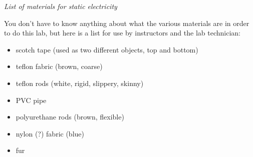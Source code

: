 \emph{List of materials for static electricity}

You don't have to know anything about what the various
materials are in order to do this lab, but here is a list for use
by instructors and the lab technician:

\begin{itemize}
\item scotch tape (used as two different objects, top and bottom)
\item teflon fabric (brown, coarse)
\item teflon rods (white, rigid, slippery, skinny)
\item PVC pipe
\item polyurethane rods (brown, flexible)
\item nylon (?) fabric (blue)
\item fur
\end{itemize}

